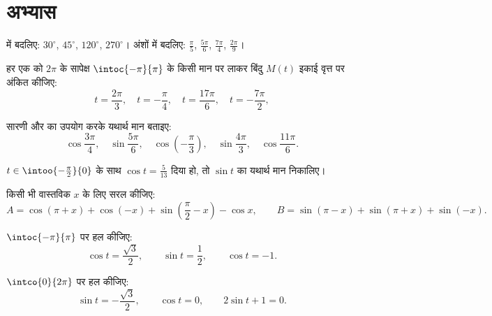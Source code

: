 \section{अभ्यास}

\begin{exercise}[$\star$]\label{exo:g11:trigo:1}
 में बदलिए: $30^\circ$, $45^\circ$, $120^\circ$, $270^\circ$। अंशों में बदलिए: $\frac{\pi}{5}$, $\frac{5\pi}{6}$,
$\frac{7\pi}{4}$, $\frac{2\pi}{9}$।
\end{exercise}

\begin{exercise}[$\star$]\label{exo:g11:trigo:2}
हर एक को $2\pi$ के सापेक्ष $\intoc{-\pi}{\pi}$ के किसी मान पर लाकर बिंदु $M(t)$ इकाई वृत्त
पर अंकित कीजिए:
\[
t = \frac{2\pi}{3},\quad
t = -\frac{\pi}{4},\quad
t = \frac{17\pi}{6},\quad
t = -\frac{7\pi}{2},
\]
\end{exercise}

\begin{exercise}[$\star$]\label{exo:g11:trigo:3}
सारणी और  का उपयोग करके यथार्थ मान बताइए:
\[
\cos\frac{3\pi}{4}, \quad
\sin\frac{5\pi}{6}, \quad
\cos\left(-\frac{\pi}{3}\right), \quad
\sin\frac{4\pi}{3}, \quad
\cos\frac{11\pi}{6} .
\]
\end{exercise}

\begin{exercise}[$\star$]\label{exo:g11:trigo:4}
$t \in \intoo{-\frac\pi2}{0}$ के साथ $\cos t = \frac{5}{13}$ दिया हो, तो $\sin t$ का यथार्थ मान निकालिए।
\end{exercise}

\begin{exercise}[$\star\star$]\label{exo:g11:trigo:5}
किसी भी वास्तविक $x$ के लिए सरल कीजिए:
\[
A = \cos(\pi + x) + \cos(-x) + \sin\left(\frac\pi2 - x\right) - \cos x,
\qquad
B = \sin(\pi - x) + \sin(\pi + x) + \sin(-x) .
\]
\end{exercise}

\begin{exercise}[$\star\star$]\label{exo:g11:trigo:6}
$\intoc{-\pi}{\pi}$ पर हल कीजिए:
\[
\cos t = \frac{\sqrt3}{2}, \qquad
\sin t = \frac12, \qquad
\cos t = -1 .
\]
\end{exercise}

\begin{exercise}[$\star\star$]\label{exo:g11:trigo:7}
$\intco{0}{2\pi}$ पर हल कीजिए:
\[
\sin t = -\frac{\sqrt3}{2}, \qquad
\cos t = 0, \qquad
2\sin t + 1 = 0 .
\]
\end{exercise}

